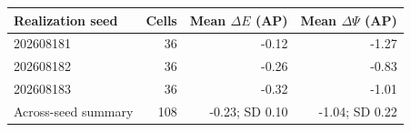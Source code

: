 \begin{tabular}{lrrr}
\toprule
Realization seed & Cells & Mean $\Delta E$ (AP) & Mean $\Delta\Psi$ (AP) \\
\midrule
202608181 & 36 & -0.12 & -1.27 \\
202608182 & 36 & -0.26 & -0.83 \\
202608183 & 36 & -0.32 & -1.01 \\
Across-seed summary & 108 & -0.23; SD 0.10 & -1.04; SD 0.22 \\
\bottomrule
\end{tabular}
